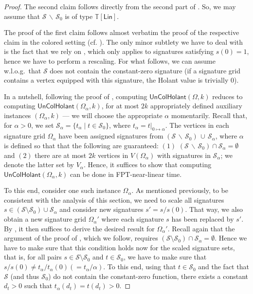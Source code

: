 \documentclass[authorcolumns,numberwithinsect]{no-lipics-v2022}
\begin{document}
\begin{proof}
The second claim follows directly from the second part of  . So, we may assume that $\mathcal{S}\,\backslash\,\mathcal{S}_0$ is of type $\mathbb{T}[\mathsf{Lin}]$.

The proof of the first claim follows almost verbatim the proof of the respective claim in the colored setting (cf. ). The only minor subtlety we have to deal with is the fact that we rely on , which only applies to signatures satisfying $s(0)=1$, hence we have to perform a rescaling. For what follows, we can assume w.l.o.g.\ that $\mathcal{S}$ does not contain the constant-zero signature (if a signature grid contains a vertex equipped with this signature, the Holant value is trivially $0$).


In a nutshell, following the proof of , computing $\mathsf{UnColHolant}(\Omega, k)$ reduces to computing $\mathsf{UnColHolant}(\Omega_{\alpha}, k)$, for at most $2k$ appropriately defined auxiliary instances $(\Omega_{\alpha}, k)$ --- we will choose the appropriate $\alpha$ momentarily. Recall that, for $\alpha>0$, we set $\mathcal{S}_\alpha = \{t_\alpha \mid t\in \mathcal{S}_0\}$, where $t_\alpha=t|_{0\mapsto \alpha}$. The vertices in each signature grid $\Omega_{\alpha}$ have been assigned signatures from $(\mathcal{S}\,\backslash\,\mathcal{S}_0)\,\cup\,\mathcal{S}_{\alpha}$, where ${\alpha}$ is defined so that that the following are guaranteed: $(1)$ $(\mathcal{S}\,\backslash\,\mathcal{S}_0) \cap \mathcal{S}_{\alpha} = \emptyset$ and $(2)$ there are at most $2k$ vertices in $V(\Omega_{\alpha})$ with signatures in $\mathcal{S}_{\alpha}$; we denote the latter set by $V_{\alpha}$. Hence, it suffices to show that computing $\mathsf{UnColHolant}(\Omega_{\alpha}, k)$ can be done in FPT-near-linear time. 

To this end, consider one such instance $\Omega_{\alpha}$. As mentioned previously, to be consistent with the analysis of this section, we need to scale all signatures $s \in (\mathcal{S} \setminus \mathcal{S}_0) \cup \mathcal{S}_{\alpha}$ and consider new signatures $s' = s / s(0)$. That way, we also obtain a new signature grid $\Omega_{\alpha}'$ where each signature $s$ has been replaced by $s'$. By , it then suffices to derive the desired result for $\Omega_{\alpha}'$. Recall again that the argument of the proof of , which we follow, requires $(\mathcal{S}\setminus\mathcal{S}_0) \cap \mathcal{S}_{\alpha} = \emptyset$. Hence we have to make sure that this condition holds now for the scaled signature sets, that is, for all pairs $s \in \mathcal{S}\setminus\mathcal{S}_0$ and $t \in \mathcal{S}_{0}$, we have to make sure that $s/s(0) \neq t_\alpha/t_\alpha(0)(=t_\alpha/\alpha)$. To this end, using that $t \in \mathcal{S}_0$ and the fact that $\mathcal{S}$ (and thus $\mathcal{S}_0$) do not contain the constant-zero function, there exists a constant $d_t>0$ such that $t_\alpha(d_t)=t(d_t)>0$.



\end{proof}
\end{document}
